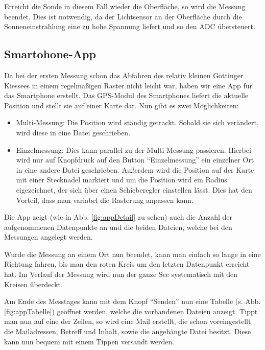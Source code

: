 \documentclass[12pt,a4paper,titlepage,headinclude,bibtotoc]{scrartcl}
\begin{document}
Erreicht die Sonde in diesem Fall wieder die Oberfläche, so wird die Messung beendet.
Dies ist notwendig, da der Lichtsensor an der Oberfläche durch die Sonneneinstrahlung eine zu hohe Spannung liefert und so den ADC übersteuert.

\subsection{Smartohone-App}
\label{sec:app}
Da bei der ersten Messung schon das Abfahren des relativ kleinen Göttinger Kiessees in einem regelmäßigen Raster nicht leicht war, haben wir eine App für das Smartphone erstellt.
Das GPS-Modul des Smartphones liefert die aktuelle Position und stellt sie auf einer Karte dar.
Nun gibt es zwei Möglichkeiten:
\begin{itemize}
	\item Multi-Messung: Die Position wird ständig getrackt.
		Sobald sie sich verändert, wird diese in eine Datei geschrieben.
	\item Einzelmessung: Dies kann parallel zu der Multi-Messung passieren.
		Hierbei wird nur auf Knopfdruck auf den Button "`Einzelmessung"' ein einzelner Ort in eine andere Datei geschrieben.
		Außerdem wird die Position auf der Karte mit einer Stecknadel markiert und um die Position wird ein Radius eigezeichnet, der sich über einen Schieberegler einstellen lässt.
		Dies hat den Vorteil, dass man variabel die Rasterung anpassen kann.
\end{itemize}

Die App zeigt (wie in Abb. \ref{fig:appDetail} zu sehen) auch die Anzahl der aufgenommenen Datenpunkte an und die beiden Dateien, welche bei den Messungen angelegt werden.

Wurde die Messung an einem Ort nun beendet, kann man einfach so lange in eine Richtung fahren, bis man den roten Kreis um den letzten Datenpunkt erreicht hat.
Im Verlauf der Messung wird nun der ganze See systematisch mit den Kreisen überdeckt.

Am Ende des Messtages kann mit dem Knopf "`Senden"' nun eine Tabelle (s. Abb. \ref{fig:appTabelle}) geöffnet werden, welche die vorhandenen Dateien anzeigt.
Tippt man nun auf eine der Zeilen, so wird eine Mail erstellt, die schon voreingestellt die Mailadressen, Betreff und Inhalt, sowie die angehängte Datei besitzt.
Diese kann nun bequem mit einem Tippen versandt werden.
\end{document}
